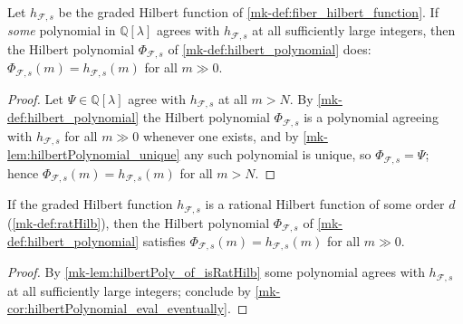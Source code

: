 \begin{corollary}\label{mk-cor:hilbertPolynomial_eval_eventually}
  \leanok

  Let \(h_{\mathcal{F},s}\) be the graded Hilbert function of
  \ref{mk-def:fiber_hilbert_function}. If \emph{some} polynomial in
  \(\mathbb{Q}[\lambda]\) agrees with \(h_{\mathcal{F},s}\) at all
  sufficiently large integers, then the Hilbert polynomial
  \(\Phi_{\mathcal{F},s}\) of \ref{mk-def:hilbert_polynomial} does:
  \(\Phi_{\mathcal{F},s}(m) = h_{\mathcal{F},s}(m)\) for all \(m \gg 0\).
\end{corollary}

\begin{proof}
  \leanok
  Let \(\Psi \in \mathbb{Q}[\lambda]\) agree with \(h_{\mathcal{F},s}\) at all
  \(m > N\). By \ref{mk-def:hilbert_polynomial} the Hilbert polynomial
  \(\Phi_{\mathcal{F},s}\) is a polynomial agreeing with
  \(h_{\mathcal{F},s}\) for all \(m \gg 0\) whenever one exists, and by
  \ref{mk-lem:hilbertPolynomial_unique} any such polynomial is unique, so
  \(\Phi_{\mathcal{F},s} = \Psi\); hence
  \(\Phi_{\mathcal{F},s}(m) = h_{\mathcal{F},s}(m)\) for all \(m > N\).
\end{proof}

\begin{corollary}\label{mk-cor:hilbertPolynomial_eval_of_isRatHilb}
  \leanok

  If the graded Hilbert function \(h_{\mathcal{F},s}\) is a rational Hilbert
  function of some order \(d\) (\ref{mk-def:ratHilb}), then the Hilbert
  polynomial \(\Phi_{\mathcal{F},s}\) of \ref{mk-def:hilbert_polynomial}
  satisfies \(\Phi_{\mathcal{F},s}(m) = h_{\mathcal{F},s}(m)\) for all
  \(m \gg 0\).
\end{corollary}

\begin{proof}
  \leanok
  By \ref{mk-lem:hilbertPoly_of_isRatHilb} some polynomial agrees with
  \(h_{\mathcal{F},s}\) at all sufficiently large integers; conclude by
  \ref{mk-cor:hilbertPolynomial_eval_eventually}.
\end{proof}

